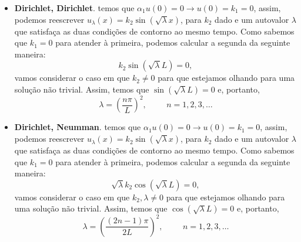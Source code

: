 \documentclass[10pt,a4paper]{article}
\newcommand{\prt}[1]{\left(#1\right)}
\begin{document}
\begin{itemize}
	\item \textbf{Dirichlet, Dirichlet}. temos que $\alpha_1u(0)=0\rightarrow u(0)=k_1=0$, assim, podemos reescrever $u_\lambda(x)=k_2\sin{\prt{\sqrt{\lambda}x}}$, para $k_2$ dado e um autovalor $\lambda$ que satisfaça as duas condições de contorno ao mesmo tempo. Como sabemos que $k_1=0$ para atender à primeira, podemos calcular a segunda da seguinte maneira: \[k_2\sin{\prt{\sqrt{\lambda}L}} = 0,\]
vamos considerar o caso em que $k_2\neq 0$ para que estejamos olhando para uma solução não trivial. Assim, temos que $\sin{\prt{\sqrt{\lambda}L}} = 0$ e, portanto, \[\lambda = \prt{\frac{n\pi}{L}}^2, \hspace{1cm}n=1,2,3,\dots\]
	\item \textbf{Dirichlet, Neumman}. temos que $\alpha_1u(0)=0\rightarrow u(0)=k_1=0$, assim, podemos reescrever $u_\lambda(x)=k_2\sin{\prt{\sqrt{\lambda}x}}$, para $k_2$ dado e um autovalor $\lambda$ que satisfaça as duas condições de contorno ao mesmo tempo. Como sabemos que $k_1=0$ para atender à primeira, podemos calcular a segunda da seguinte maneira: \[\sqrt{\lambda}k_2\cos{\prt{\sqrt{\lambda}L}} = 0,\]
vamos considerar o caso em que $k_2,\lambda\neq 0$ para que estejamos olhando para uma solução não trivial. Assim, temos que $\cos{\prt{\sqrt{\lambda}L}} = 0$ e, portanto, \[\lambda = \prt{\frac{(2n-1)\pi}{2L}}^2, \hspace{1cm}n=1,2,3,\dots\]
\end{itemize}
\end{document}
